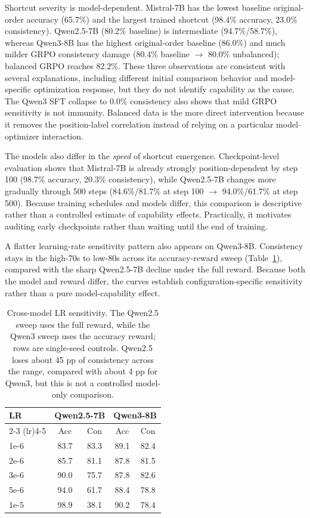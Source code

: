\documentclass[letterpaper]{article}
\begin{document}
Shortcut severity is model-dependent. Mistral-7B has the lowest baseline original-order accuracy (65.7\%) and the largest trained shortcut (98.4\% accuracy, 23.0\% consistency). Qwen2.5-7B (80.2\% baseline) is intermediate (94.7\%/58.7\%), whereas Qwen3-8B has the highest original-order baseline (86.0\%) and much milder GRPO consistency damage (80.4\% baseline $\to$ 80.0\% unbalanced); balanced GRPO reaches 82.2\%. These three observations are consistent with several explanations, including different initial comparison behavior and model-specific optimization response, but they do not identify capability as the cause. The Qwen3 SFT collapse to 0.0\% consistency also shows that mild GRPO sensitivity is not immunity. Balanced data is the more direct intervention because it removes the position-label correlation instead of relying on a particular model--optimizer interaction.

The models also differ in the \emph{speed} of shortcut emergence. Checkpoint-level evaluation shows that Mistral-7B is already strongly position-dependent by step 100 (98.7\% accuracy, 20.3\% consistency), while Qwen2.5-7B changes more gradually through 500 steps (84.6\%/81.7\% at step 100 $\to$ 94.0\%/61.7\% at step 500). Because training schedules and models differ, this comparison is descriptive rather than a controlled estimate of capability effects. Practically, it motivates auditing early checkpoints rather than waiting until the end of training.

A flatter learning-rate sensitivity pattern also appears on Qwen3-8B. Consistency stays in the high-70s to low-80s across its accuracy-reward sweep (Table~\ref{tab:crosslr}), compared with the sharp Qwen2.5-7B decline under the full reward. Because both the model and reward differ, the curves establish configuration-specific sensitivity rather than a pure model-capability effect.

\begin{table}[H]
\centering
\footnotesize
\begin{tabular}{lcccc}
\toprule
\textbf{LR} & \multicolumn{2}{c}{\textbf{Qwen2.5-7B}} & \multicolumn{2}{c}{\textbf{Qwen3-8B}} \\
\cmidrule(lr){2-3} \cmidrule(lr){4-5}
 & Acc & Con & Acc & Con \\
\midrule
1e-6 & 83.7 & 83.3 & 89.1 & 82.4 \\
2e-6 & 85.7 & 81.1 & 87.8 & 81.5 \\
3e-6 & 90.0 & 75.7 & 87.8 & 82.6 \\
5e-6 & 94.0 & 61.7 & 88.4 & 78.8 \\
1e-5 & 98.9 & 38.1 & 90.2 & 78.4 \\
\bottomrule
\end{tabular}
\caption{Cross-model LR sensitivity. The Qwen2.5 sweep uses the full reward, while the Qwen3 sweep uses the accuracy reward; rows are single-seed controls. Qwen2.5 loses about 45 pp of consistency across the range, compared with about 4 pp for Qwen3, but this is not a controlled model-only comparison.}
\label{tab:crosslr}
\end{table}
\end{document}
